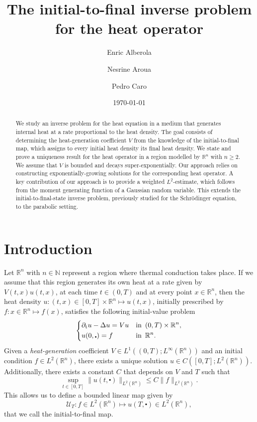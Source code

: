 \documentclass[10pt,a4paper]{amsart}
\title[Initial-to-final for the heat operator]{The initial-to-final inverse problem\\
for the heat operator}
\author[Alberola]{Enric Alberola}
\author[Aroua]{Nesrine Aroua}
\author[Caro]{Pedro Caro}
\theoremstyle{remark}
\theoremstyle{definition}
\newcommand{\R}{\mathbb{R}}
\newcommand{\N}{\mathbb{N}}
\newcommand{\tm}{\mathrm{t}}
\newcommand{\marnote}[1]{\marginpar{\footnotesize #1}} %
\begin{document}
\begin{abstract}
We study an inverse problem for the heat equation in a medium that generates internal heat at a 
rate proportional to the heat density. The goal consists of determining the
heat-generation coefficient 
$V$ from the knowledge of the initial-to-final map, which assigns to every initial heat density its 
final heat density. We state and prove a uniqueness result for the heat operator in
a region modelled by $\R^n$ with $n \geq 2$.
We assume that $V$ is bounded and decays super-exponentially.
Our approach relies on constructing exponentially-growing solutions for
the corresponding heat operator. A key contribution of our approach is to provide a 
weighted $L^2$-estimate, which follows from the moment generating function of a Gaussian random 
variable. This extends the initial-to-final-state inverse problem, previously studied for the 
Schrödinger equation, to the parabolic setting.
\end{abstract}



\date{\today}



\maketitle

\section{Introduction}\label{sec: intro}
Let $\R^n$ with $n \in \N$ represent a region where thermal conduction takes place.
If we assume that this region generates its own heat at a rate given by 
$V(t, x) u(t, x)$, at each time $t \in (0, T)$ and at every point $x \in \R^n$,
then the heat density 
$u : (t, x) \in [0,T] \times \R^n \mapsto u(t, x) $,
initially prescribed by $f : x \in \R^n \mapsto f(x)$, satisfies the following initial-value problem
\begin{equation}
	\left\{
		\begin{aligned}
		& \partial_\tm u - \Delta u = V u & & \textnormal{in} \enspace (0,T) \times \R^n, \\
		& u(0, \centerdot) = f &  & \textnormal{in} \enspace \R^n.
		\end{aligned}
	\right.
	\label{pb:IVP}
\end{equation}
Given a \textit{heat-generation} coefficient $V \in L^1((0,T); L^\infty(\R^n))$
and an initial condition $f \in L^2(\R^n)$,
there exists a unique solution
$u \in C([0,T]; L^2(\R^n))$.
Additionally, there exists a constant $C$ that depends on $V$ and $T$ such that
\[ \sup_{t \in [0,T]} \| u(t, \centerdot) \|_{L^2 (\R^n)} \leq C \| f \|_{L^2(\R^n)}. \]
This allows us to define a bounded linear map given by
\[ \mathcal{U}_T : f \in L^2(\R^n) \longmapsto u(T, \centerdot) \in L^2(\R^n), \]
that we call the initial-to-final map.
\end{document}
